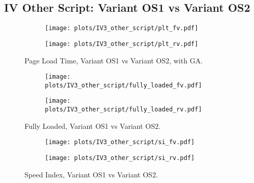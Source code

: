 
\subsection{IV Other Script: Variant OS1 vs Variant OS2}





\begin{figure}
	\centering
	\begin{subfigure}{.5\textwidth}
		\centering
		\texttt{[image: plots/IV3\_other\_script/plt\_fv.pdf]}
		\label{fig:sub1}
	\end{subfigure}%
	\begin{subfigure}{.5\textwidth}
		\centering
		\texttt{[image: plots/IV3\_other\_script/plt\_rv.pdf]}
		\label{fig:sub2}
	\end{subfigure}
	\caption{Page Load Time, Variant OS1 vs Variant OS2, with GA.}
	\label{figure:plt_original_test}
\end{figure}


\begin{figure}
	\centering
	\begin{subfigure}{.5\textwidth}
		\centering
		\texttt{[image: plots/IV3\_other\_script/fully\_loaded\_fv.pdf]}
		\label{fig:sub1}
	\end{subfigure}%
	\begin{subfigure}{.5\textwidth}
		\centering
		\texttt{[image: plots/IV3\_other\_script/fully\_loaded\_rv.pdf]}
		\label{fig:sub2}
	\end{subfigure}
	\caption{Fully Loaded, Variant OS1 vs Variant OS2.}
	\label{figure:plt_original_test}
\end{figure}

\clearpage

\begin{figure}
	\centering
	\begin{subfigure}{.5\textwidth}
		\centering
		\texttt{[image: plots/IV3\_other\_script/si\_fv.pdf]}
		\label{fig:sub1}
	\end{subfigure}%
	\begin{subfigure}{.5\textwidth}
		\centering
		\texttt{[image: plots/IV3\_other\_script/si\_rv.pdf]}
		\label{fig:sub2}
	\end{subfigure}
	\caption{Speed Index, Variant OS1 vs Variant OS2.}
	\label{figure:plt_original_test}
\end{figure}


